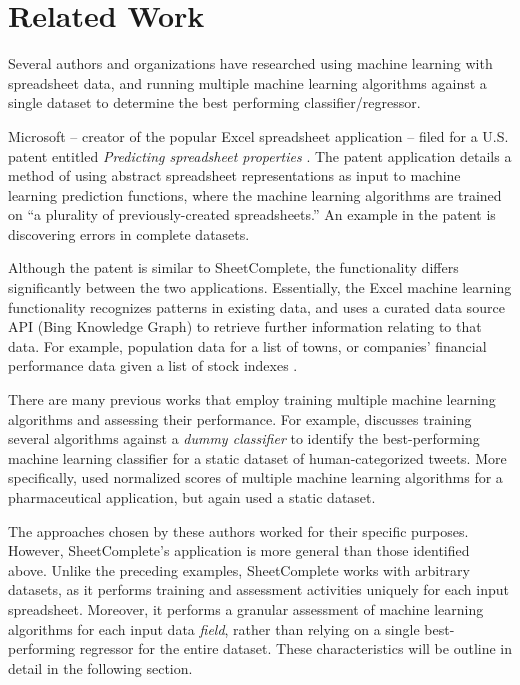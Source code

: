 \documentclass[conference]{IEEEtran}
\begin{document}
\section{Related Work}
Several authors and organizations have researched using machine learning with spreadsheet data, and running multiple machine learning algorithms against a single dataset to determine the best performing classifier/regressor.

Microsoft -- creator of the popular Excel spreadsheet application -- filed for a U.S. patent entitled \textit{Predicting spreadsheet properties} \cite{singh_predicting_2018}. The patent application details a method of using abstract spreadsheet representations as input to machine learning prediction functions, where the machine learning algorithms are trained on ``a plurality of previously-created spreadsheets.'' An example in the patent is discovering errors in complete datasets.

Although the patent is similar to SheetComplete, the functionality differs significantly between the two applications. Essentially, the Excel machine learning functionality recognizes patterns in existing data, and uses a curated data source API (Bing Knowledge Graph) to retrieve further information relating to that data. For example, population data for a list of towns, or companies' financial performance data given a list of stock indexes \cite{lardinois_excel_2018}.

There are many previous works that employ training multiple machine learning algorithms and assessing their performance. For example, \cite{kim_classification_2017} discusses training several algorithms against a \textit{dummy classifier} to identify the best-performing machine learning classifier for a static dataset of human-categorized tweets. More specifically, \cite{russo_comparing_2018} used normalized scores of multiple machine learning algorithms for a pharmaceutical application, but again used a static dataset.

The approaches chosen by these authors worked for their specific purposes. However, SheetComplete's application is more general than those identified above. Unlike the preceding examples, SheetComplete works with arbitrary datasets, as it performs training and assessment activities uniquely for each input spreadsheet. Moreover, it performs a granular assessment of machine learning algorithms for each input data \textit{field}, rather than relying on a single best-performing regressor for the entire dataset. These characteristics will be outline in detail in the following section.
\end{document}

